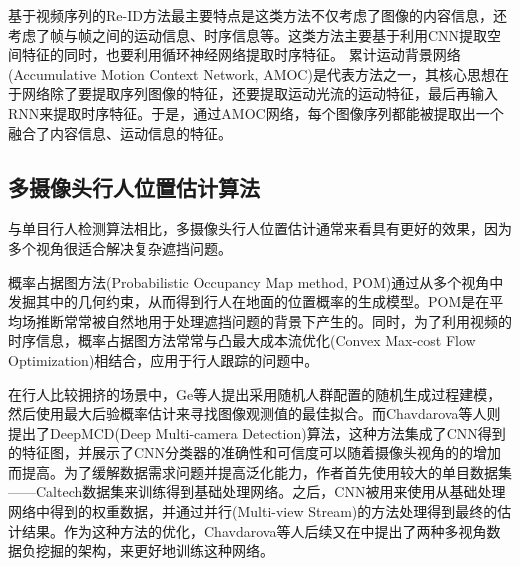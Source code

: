 基于视频序列的Re-ID方法最主要特点是这类方法不仅考虑了图像的内容信息，还考虑了帧与帧之间的运动信息、时序信息等。这类方法主要基于利用CNN提取空间特征的同时，也要利用循环神经网络提取时序特征。 累计运动背景网络(Accumulative Motion Context Network, AMOC)\cite{liu2017video}是代表方法之一，其核心思想在于网络除了要提取序列图像的特征，还要提取运动光流的运动特征，最后再输入RNN来提取时序特征。于是，通过AMOC网络，每个图像序列都能被提取出一个融合了内容信息、运动信息的特征。



\subsection{多摄像头行人位置估计算法}

与单目行人检测算法相比，多摄像头行人位置估计通常来看具有更好的效果，因为多个视角很适合解决复杂遮挡问题\cite{baque2017deep}。

概率占据图方法(Probabilistic Occupancy Map method, POM)\cite{fleuret2007multicamera}通过从多个视角中发掘其中的几何约束，从而得到行人在地面的位置概率的生成模型。POM是在平均场推断常常被自然地用于处理遮挡问题的背景下产生的。同时，为了利用视频的时序信息，概率占据图方法常常与凸最大成本流优化(Convex Max-cost Flow Optimization)\cite{berclaz2009multiple}相结合，应用于行人跟踪的问题中。

在行人比较拥挤的场景中，Ge\cite{ge2010crowd}等人提出采用随机人群配置的随机生成过程建模，然后使用最大后验概率估计来寻找图像观测值的最佳拟合。而Chavdarova\cite{chavdarova2017deep}等人则提出了DeepMCD(Deep Multi-camera Detection)算法，这种方法集成了CNN得到的特征图，并展示了CNN分类器的准确性和可信度可以随着摄像头视角的的增加而提高。为了缓解数据需求问题并提高泛化能力，作者首先使用较大的单目数据集——Caltech数据集\cite{dollar2009pedestrian}来训练得到基础处理网络。之后，CNN被用来使用从基础处理网络中得到的权重数据，并通过并行(Multi-view Stream)的方法处理得到最终的估计结果。作为这种方法的优化，Chavdarova等人后续又在\cite{chavdarova2017deep}中提出了两种多视角数据负挖掘的架构，来更好地训练这种网络。

